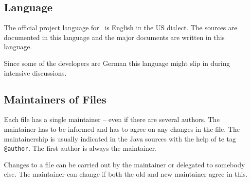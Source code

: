 \subsection{Language}

The official project language for \ExTeX\ is English in the US
dialect. The sources are documented in this language and the major
documents are written in this language.

Since some of the developers are German this language might slip in
during intensive discussions.


\subsection{Maintainers of Files}

Each file has a single maintainer -- even if there are several
authors. The maintainer has to be informed and has to agree on any
changes in the file. The maintainership is usually indicated in the
Java sources with the help of te tag \texttt{@author}. The first
author is always the maintainer.

Changes to a file can be carried out by the maintainer or delegated to
somebody else. The maintainer can change if both the old and new
maintainer agree in this.

